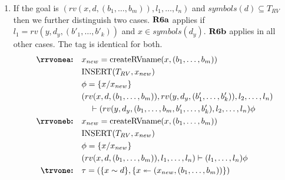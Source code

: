 \begin{definition}
\begin{enumerate}
		\item[\bf \crvone]  If the goal is $(rv(x, d, (b_1, \dots, b_{m})), l_1,\dots, l_n)$ and   $symbols(d)\subseteq T_{RV}$ then we further  distinguish two cases.
		$\text{\bf R6a}$ applies if $l_1 = rv(y, d_y, (b'_1, \dots, b'_k))$ and $x\in symbols(d_y)$. $\text{\bf R6b}$ applies in all other cases.  The tag is identical for both.
		\begin{align*}
			{\text{\bf \rrvonea:}} \quad
			&x_{new} = \mathrm{createRVname}(x,(b_1,\dots, b_m)) \\
			& \mathrm{INSERT}(T_{RV}, x_{new}) \\
			&\phi = \{ x/ x_{new} \} \\
			&(rv(x, d, (b_1, \dots, b_{m})), rv(y, d_y, (b'_1, \dots, b'_k)) , l_2, \dots, l_n) \\
			&~~~    \vdash (rv(y, d_y, (b_1, \dots, b_{m}, b'_1, \dots, b'_k) , l_2, \dots, l_n)\phi
			\\
			{\text{\bf \rrvoneb:}} \quad
			&x_{new} = \mathrm{createRVname}(x,(b_1,\dots, b_m)) \\
			& \mathrm{INSERT}(T_{RV}, x_{new}) \\
			&\phi = \{ x/ x_{new} \} \\
			&(rv(x, d, (b_1, \dots, b_{m})), l_1, \dots, l_n) \vdash (l_1, \dots, l_n)\phi
			\\
			{\text{\bf \trvone:}} \quad &\tau =  (\{x\sim d \}, \{x\twoheadleftarrow (x_{new},(b_1,\dots, b_m))\})
		\end{align*}
	\end{enumerate}
\end{definition}
